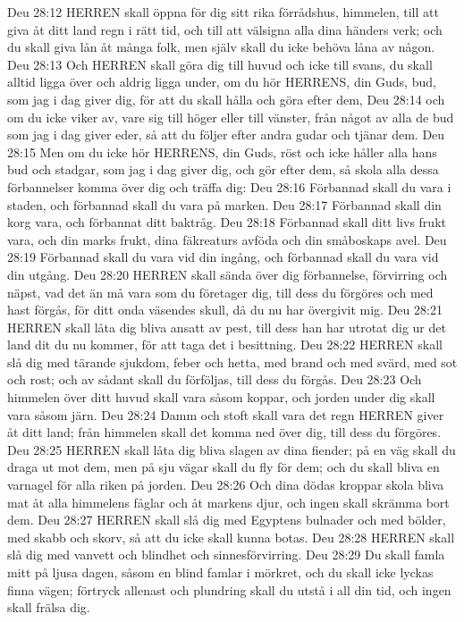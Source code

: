 Deu 28:12  HERREN skall öppna för dig sitt rika förrådshus, himmelen, till att giva åt ditt land regn i rätt tid, och till att välsigna alla dina händers verk; och du skall giva lån åt många folk, men själv skall du icke behöva låna av någon.
Deu 28:13  Och HERREN skall göra dig till huvud och icke till svans, du skall alltid ligga över och aldrig ligga under, om du hör HERRENS, din Guds, bud, som jag i dag giver dig, för att du skall hålla och göra efter dem,
Deu 28:14  och om du icke viker av, vare sig till höger eller till vänster, från något av alla de bud som jag i dag giver eder, så att du följer efter andra gudar och tjänar dem.
Deu 28:15  Men om du icke hör HERRENS, din Guds, röst och icke håller alla hans bud och stadgar, som jag i dag giver dig, och gör efter dem, så skola alla dessa förbannelser komma över dig och träffa dig:
Deu 28:16  Förbannad skall du vara i staden, och förbannad skall du vara på marken.
Deu 28:17  Förbannad skall din korg vara, och förbannat ditt baktråg.
Deu 28:18  Förbannad skall ditt livs frukt vara, och din marks frukt, dina fäkreaturs avföda och din småboskaps avel.
Deu 28:19  Förbannad skall du vara vid din ingång, och förbannad skall du vara vid din utgång.
Deu 28:20  HERREN skall sända över dig förbannelse, förvirring och näpst, vad det än må vara som du företager dig, till dess du förgöres och med hast förgås, för ditt onda väsendes skull, då du nu har övergivit mig.
Deu 28:21  HERREN skall låta dig bliva ansatt av pest, till dess han har utrotat dig ur det land dit du nu kommer, för att taga det i besittning.
Deu 28:22  HERREN skall slå dig med tärande sjukdom, feber och hetta, med brand och med svärd, med sot och rost; och av sådant skall du förföljas, till dess du förgås.
Deu 28:23  Och himmelen över ditt huvud skall vara såsom koppar, och jorden under dig skall vara såsom järn.
Deu 28:24  Damm och stoft skall vara det regn HERREN giver åt ditt land; från himmelen skall det komma ned över dig, till dess du förgöres.
Deu 28:25  HERREN skall låta dig bliva slagen av dina fiender; på en väg skall du draga ut mot dem, men på sju vägar skall du fly för dem; och du skall bliva en varnagel för alla riken på jorden.
Deu 28:26  Och dina dödas kroppar skola bliva mat åt alla himmelens fåglar och åt markens djur, och ingen skall skrämma bort dem.
Deu 28:27  HERREN skall slå dig med Egyptens bulnader och med bölder, med skabb och skorv, så att du icke skall kunna botas.
Deu 28:28  HERREN skall slå dig med vanvett och blindhet och sinnesförvirring.
Deu 28:29  Du skall famla mitt på ljusa dagen, såsom en blind famlar i mörkret, och du skall icke lyckas finna vägen; förtryck allenast och plundring skall du utstå i all din tid, och ingen skall frälsa dig.
